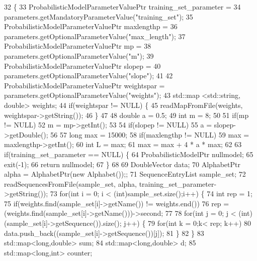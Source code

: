 \begin{DoxyCode}
32   \{
33     ProbabilisticModelParameterValuePtr training\_set\_parameter =
34       parameters.getMandatoryParameterValue(\textcolor{stringliteral}{"training\_set"});
35     ProbabilisticModelParameterValuePtr maxlengthp =
36       parameters.getOptionalParameterValue(\textcolor{stringliteral}{"max\_length"});
37     ProbabilisticModelParameterValuePtr mp =
38       parameters.getOptionalParameterValue(\textcolor{stringliteral}{"m"});
39     ProbabilisticModelParameterValuePtr slopep =
40       parameters.getOptionalParameterValue(\textcolor{stringliteral}{"slope"});
41 
42     ProbabilisticModelParameterValuePtr weightspar = parameters.getOptionalParameterValue(\textcolor{stringliteral}{"weights"});
43     std::map <std::string, double> weights;
44     \textcolor{keywordflow}{if}(weightspar != NULL) \{
45       readMapFromFile(weights, weightspar->getString());
46     \}
47 
48     \textcolor{keywordtype}{double} a = 0.5;
49     \textcolor{keywordtype}{int} m = 8;
50 
51     \textcolor{keywordflow}{if}(mp != NULL)
52         m = mp->getInt();
53 
54     \textcolor{keywordflow}{if}(slopep != NULL)
55         a = slopep->getDouble();
56 
57     \textcolor{keywordtype}{long} max = 15000;
58     \textcolor{keywordflow}{if}(maxlengthp != NULL)
59         max = maxlengthp->getInt();
60     \textcolor{keywordtype}{int} L = max;
61     max = max + 4 * a * max;
62 
63     \textcolor{keywordflow}{if}(training\_set\_parameter == NULL) \{
64       ProbabilisticModelPtr nullmodel;
65       exit(-1);
66       \textcolor{keywordflow}{return} nullmodel;
67     \}
68 
69     DoubleVector data;
70     AlphabetPtr alpha = AlphabetPtr(\textcolor{keyword}{new} Alphabet());;
71     SequenceEntryList sample\_set;
72     readSequencesFromFile(sample\_set, alpha, training\_set\_parameter->getString());
73     \textcolor{keywordflow}{for}(\textcolor{keywordtype}{int} i = 0; i < (int)sample\_set.size();i++) \{
74       \textcolor{keywordtype}{int} rep = 1;
75       \textcolor{keywordflow}{if}(weights.find(sample\_set[i]->getName()) != weights.end())
76         rep = (weights.find(sample\_set[i]->getName()))->second;
77 
78       \textcolor{keywordflow}{for}(\textcolor{keywordtype}{int} j = 0; j < (int) (sample\_set[i]->getSequence()).size(); j++) \{
79         \textcolor{keywordflow}{for}(\textcolor{keywordtype}{int} k = 0;k< rep; k++)
80             data.push\_back((sample\_set[i]->getSequence())[j]);
81       \}
82     \}
83     std::map<long,double> sum;
84     std::map<long,double> d;
85     std::map<long,int> counter;

\end{DoxyCode}

